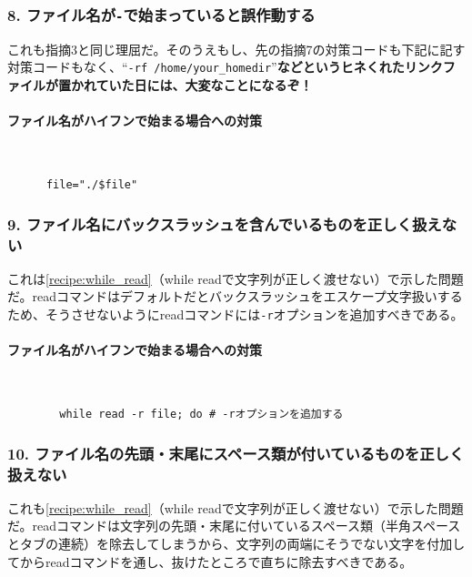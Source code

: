 \subsubsection*{8. ファイル名が\verb|-|で始まっていると誤作動する}

これも指摘3と同じ理屈だ。そのうえもし、先の指摘7の対策コードも下記に記す対策コードもなく、``\verb|-rf /home/your_homedir|''\textbf{などというヒネくれたリンクファイルが置かれていた日には、大変なことになるぞ！}

\paragraph{ファイル名がハイフンで始まる場合への対策} 　\\
\begin{frameboxit}{160.0mm}
\begin{verbatim}
	  file="./$file"
\end{verbatim}
\end{frameboxit}

\subsubsection*{9. ファイル名にバックスラッシュを含んでいるものを正しく扱えない}

これは\ref{recipe:while_read}（while readで文字列が正しく渡せない）で示した問題だ。readコマンドはデフォルトだとバックスラッシュをエスケープ文字扱いするため、そうさせないようにreadコマンドには\verb|-r|オプションを追加すべきである。

\paragraph{ファイル名がハイフンで始まる場合への対策} 　\\
\begin{frameboxit}{160.0mm}
\begin{verbatim}
		while read -r file; do # -rオプションを追加する
\end{verbatim}
\end{frameboxit}

\subsubsection*{10. ファイル名の先頭・末尾にスペース類が付いているものを正しく扱えない}

これも\ref{recipe:while_read}（while readで文字列が正しく渡せない）で示した問題だ。readコマンドは文字列の先頭・末尾に付いているスペース類（半角スペースとタブの連続）を除去してしまうから、文字列の両端にそうでない文字を付加してからreadコマンドを通し、抜けたところで直ちに除去すべきである。

